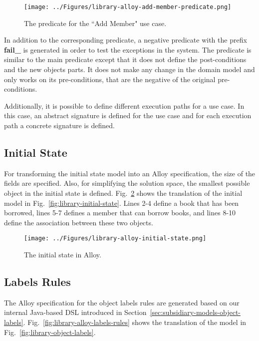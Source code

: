 \begin{figure}[h]
\centering
\texttt{[image: ../Figures/library-alloy-add-member-predicate.png]}
\caption{The predicate for the ``Add Member" use case.}
\label{fig:library-alloy-add-member-predicate}
\end{figure}

In addition to the corresponding predicate, a negative predicate with the prefix \textbf{fail\_} is generated in order to test the exceptions in the system. The predicate is similar to the main predicate except that it does not define the post-conditions and the new objects parts. It does not make any change in the domain model and only works on its pre-conditions, that are the negative of the original pre-conditions.

Additionally, it is possible to define different execution paths for a use case. In this case, an abstract signature is defined for the use case and for each execution path a concrete signature is defined. 

\subsection{Initial State}
\label{sec:alloy-initial-state}
For transforming the initial state model into an Alloy specification, the size of the fields are specified. Also, for simplifying the solution space, the smallest possible object in the initial state is defined. Fig.~\ref{fig:library-alloy-initial-state} shows the translation of the initial model in Fig.~\ref{fig:library-initial-state}. Lines 2-4 define a book that has been borrowed, lines 5-7 defines a member that can borrow books, and lines 8-10 define the association between these two objects.

\begin{figure}[h]
\centering
\texttt{[image: ../Figures/library-alloy-initial-state.png]}
\caption{The initial state in Alloy.}
\label{fig:library-alloy-initial-state}
\end{figure}

\subsection{Labels Rules}
\label{sec:alloy-labels-rules}
The Alloy specification for the object labels rules are generated based on our internal Java-based DSL introduced in Section~\ref{sec:subsidiary-models-object-labels}. Fig.~\ref{fig:library-alloy-labels-rules} shows the translation of the model in Fig.~\ref{fig:library-object-labels}.

